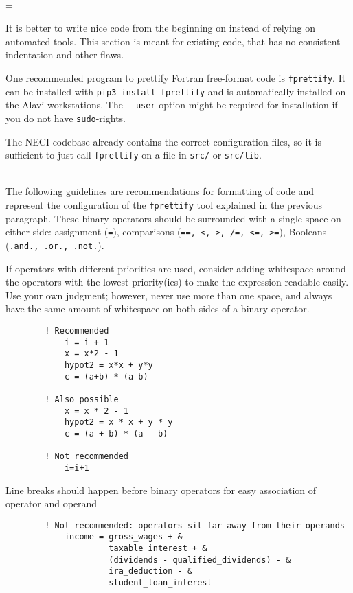 \documentclass[a4paper,notitlepage,dvipsnames]{scrreprt}
\newcommand\headitem[1]{\needspace{1.5\baselineskip}\item[{\boldmath #1 \nopagebreak}] \hfill \\ \nopagebreak}
\let\code\lstinline
\newenvironment{warningbox}
	{\par\begin{mdframed}[%
		linewidth = 2pt, %
	    linecolor = red, %
	    roundcorner = 6pt, %
		backgroundcolor = gray!20
	]\begin{list}{}{\leftmargin=1cm
			           \labelwidth=\leftmargin}\item[\Large\ding{43}]}
	{\end{list}\end{mdframed}\par}
\begin{document}
\begin{description}
	\headitem{Tools for adhering to the style guide}
    \label{item:fprettify}
	\begin{warningbox}
      It is better to write nice code from the beginning on
      instead of relying on automated tools.
      This section is meant for existing code, that has no consistent
      indentation and other flaws.
	\end{warningbox}
    One recommended program to prettify Fortran free-format code is
    \code{fprettify}.
    It can be installed with \code{pip3 install fprettify}
    and is automatically installed on the Alavi workstations.
    The \code{--user} option might be required for installation
    if you do not have \code{sudo}-rights.

    The NECI codebase already contains the correct configuration files,
    so it is sufficient to just call \code{fprettify} on a file in
    \code{src/} or \code{src/lib}.

    \headitem{Operator Layout}
    The following guidelines are recommendations for formatting of code and
    represent the configuration of the \code{fprettify} tool explained in the previous
    paragraph.
        These binary operators should be surrounded with a single space on either side:
        assignment (\code{=}), comparisons (\code{==, <, >, /=, <=, >=}),
        Booleans (\code{.and., .or., .not.}).

        If operators with different priorities are used, consider adding
        whitespace around the operators with the lowest priority(ies) to make
        the expression readable easily.
        Use your own judgment; however, never use more than one space,
        and always have the same amount of whitespace on both sides
        of a binary operator.

        \begin{lstlisting}
        ! Recommended
            i = i + 1
            x = x*2 - 1
            hypot2 = x*x + y*y
            c = (a+b) * (a-b)

        ! Also possible
            x = x * 2 - 1
            hypot2 = x * x + y * y
            c = (a + b) * (a - b)

        ! Not recommended
            i=i+1
        \end{lstlisting}

        Line breaks should happen before binary operators for easy
        association of operator and operand
        \begin{lstlisting}
        ! Not recommended: operators sit far away from their operands
            income = gross_wages + &
                     taxable_interest + &
                     (dividends - qualified_dividends) - &
                     ira_deduction - &
                     student_loan_interest


\end{lstlisting}
\end{description}
\end{document}
